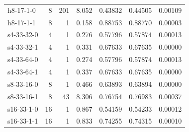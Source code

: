 \begin{longtable}{lrrrrrr}
h8-17-1-0 & 8 & 201 & 8.052 & 0.43832 & 0.44505 & 0.00109 \\
h8-17-1-1 & 8 & 1 & 0.158 & 0.88753 & 0.88770 & 0.00003 \\
s4-33-32-0 & 4 & 1 & 0.276 & 0.57796 & 0.57874 & 0.00013 \\
s4-33-32-1 & 4 & 1 & 0.331 & 0.67633 & 0.67635 & 0.00000 \\
s4-33-64-0 & 4 & 1 & 0.274 & 0.57796 & 0.57874 & 0.00013 \\
s4-33-64-1 & 4 & 1 & 0.337 & 0.67633 & 0.67635 & 0.00000 \\
s8-33-16-0 & 8 & 1 & 0.466 & 0.63893 & 0.63894 & 0.00000 \\
s8-33-16-1 & 8 & 43 & 8.306 & 0.76754 & 0.76983 & 0.00037 \\
s16-33-1-0 & 16 & 1 & 0.867 & 0.54159 & 0.54233 & 0.00012 \\
s16-33-1-1 & 16 & 1 & 0.833 & 0.74255 & 0.74315 & 0.00010 \\
\bottomrule\end{longtable}
